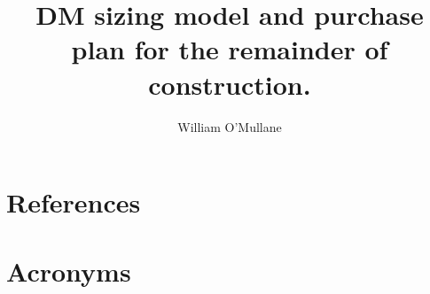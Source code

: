 \documentclass[DM,authoryear,toc]{lsstdoc}
\title{DM sizing model and purchase plan for the remainder of construction.}
\author{%
William O'Mullane
}
\date{\vcsDate}
\begin{document}
\mkshorttitle



\appendix
\section{References} \label{sec:bib}


\section{Acronyms} \label{sec:acronyms}

\end{document}
